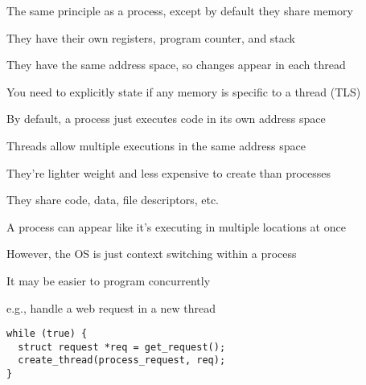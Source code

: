   \begin{slide}


    The same principle as a process, except by default they share memory

    \leftspace{}They have their own registers, program counter, and stack
    \medskip

    They have the same address space, so changes appear in each thread
    \medskip

    You need to explicitly state if any memory is specific to a thread (TLS)

  \end{slide}

  \begin{slide}


    By default, a process just executes code in its own address space
    \medskip

    Threads allow multiple executions in the same address space
    \medskip

    They're lighter weight and less expensive to create than processes

    \leftspace{}They share code, data, file descriptors, etc.

  \end{slide}

  \begin{slide}


    A process can appear like it's executing in multiple locations at once

    \leftspace{}However, the OS is just context switching within a process
    \medskip

    It may be easier to program concurrently

    \leftspace{}e.g., handle a web request in a new thread
    \medskip

    \begin{verbatim}
while (true) {
  struct request *req = get_request();
  create_thread(process_request, req);
}
    \end{verbatim}

  \end{slide}

